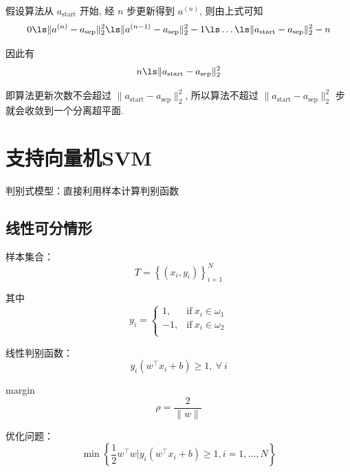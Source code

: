\documentclass[openany]{ctexbook}
\theoremstyle{kaiti}
\theoremstyle{normal}
\begin{document}
假设算法从 $a_{\mathrm{start}}$ 开始, 经 $n$ 步更新得到 $a^{(n)}$, 则由上式可知
\begin{equation}
  0\ls\|a^{(n)}-a_{\mathrm{sep}}\|_2^2\ls\|a^{(n-1)}-a_{\mathrm{sep}}\|_2^2-1\ls\dots\ls\|a_{\mathrm{start}}-a_{\mathrm{sep}}\|_2^2-n
\end{equation}

因此有
\begin{equation}
  n\ls\|a_{\mathrm{start}}-a_{\mathrm{sep}}\|_2^2
\end{equation}

即算法更新次数不会超过 $\|a_{\mathrm{start}}-a_{\mathrm{sep}}\|_2^2$, 所以算法不超过 $\|a_{\mathrm{start}}-a_{\mathrm{sep}}\|_2^2$ 步就会收敛到一个分离超平面.

\chapter{支持向量机SVM}

判别式模型：直接利用样本计算判别函数

\section{线性可分情形}

样本集合：
\begin{equation}
  T=\left\{ \left(x_i,y_i \right)\right\}_{i=1}^{N}
\end{equation}

其中
\begin{equation}
  y_i=
  \begin{cases}
    1, &\mathrm{if}~x_i\in \omega_1\\
    -1, &\mathrm{if}~x_i\in \omega_2\\
  \end{cases}
\end{equation}

线性判别函数：
\begin{equation}
  y_i\left(w^{\top}x_i+b \right)\geqslant 1,~\forall~i
\end{equation}

margin 
\begin{equation}
  \rho=\frac{2}{\|w\|}
\end{equation}

优化问题：
\begin{equation}
  \min \left\{\frac{1}{2}w^{\top}w|y_i\left(w^{\top}x_i+b \right)\geqslant 1, i=1,\dots ,N \right\}
\end{equation}
\end{document}
